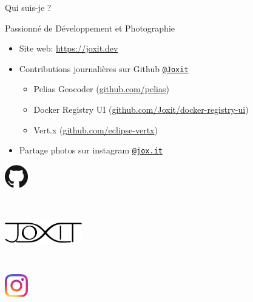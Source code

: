 \begin{frame}{Qui suis-je ?}

\begin{exampleblock}{Passionné de Développement et Photographie}
  \begin{itemize}
    \item Site web: \url{https://joxit.dev}
    \item Contributions journalières sur Github \href{https://github.com/Joxit}{\texttt{@Joxit}}
      \begin{itemize}
        \item Pelias Geocoder (\href{https://github.com/pelias/}{github.com/pelias})
        \item Docker Registry UI (\href{https://github.com/Joxit/docker-registry-ui}{github.com/Joxit/docker-registry-ui})
        \item Vert.x (\href{https://github.com/eclipse-vertx}{github.com/eclipse-vertx})
      \end{itemize}
    \item Partage photos sur instagram \href{https://instagram.com/jox.it}{\texttt{@jox.it}}
  \end{itemize}
  \begin{center}
    \begin{minipage}{0.33\textwidth}
      \centering \includegraphics[height=1cm,keepaspectratio]{images/github.png}
    \end{minipage}~
    \begin{minipage}{0.33\textwidth}
      \centering \includegraphics[height=1cm,keepaspectratio]{images/joxit.png}
    \end{minipage}~
    \begin{minipage}{0.33\textwidth}
      \centering \includegraphics[height=1cm,keepaspectratio]{images/instagram.png}
    \end{minipage}
  \end{center}
\end{exampleblock}

\end{frame}